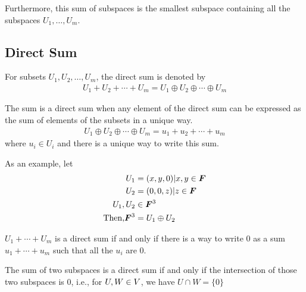 \documentclass[../../linear_algebra.tex]{subfiles}
\begin{document}
Furthermore, this sum of subspaces is the smallest subspace containing all the subspaces $U_{1}, \ldots, U_{m}$.

\subsection{Direct Sum}
For subsets $U_{1}, U_{2}, \ldots, U_{m}$, the direct sum is denoted by
\begin{align*}
    U_{1} + U_{2} + \cdots + U_{m} = U_{1} \oplus U_{2} \oplus \cdots \oplus U_{m} 
\end{align*}

The sum is a direct sum when any element of the direct sum can be expressed as the sum of elements of the subsets in a unique way.
\begin{align*}
    U_{1} \oplus U_{2} \oplus \cdots \oplus U_{m} = u_{1} + u_{2} + \cdots + u_{m}
\end{align*}
where $u_{i} \in U_{i}$ and there is a unique way to write this sum.\newline

As an example, let
\begin{align*}
    U_{1} &= {(x,y,0) | x,y \in \bm{F}}\\
    U_{2} &= {(0,0,z) | z \in \bm{F}}\\
    U_{1}, U_{2} &\in \bm{F}^{3}\\
    \text{Then,} \bm{F}^{3} &= U_{1} \oplus U_{2}
\end{align*}

$U_{1} + \cdots + U_{m}$ is a direct sum if and only if there is a way to write $0$ as a sum $u_{1} + \cdots + u_{m}$ such that all the $u_{i}$ are $0$.\newline

The sum of two subspaces is a direct sum if and only if the intersection of those two subspaces is $0$, i.e., for $U, W \in V$, we have $U \cap W = \{ 0 \}$
\end{document}
